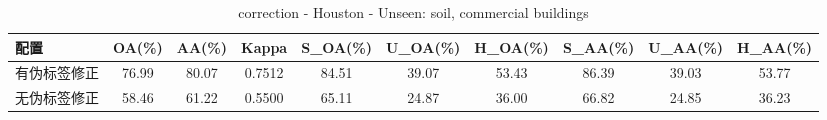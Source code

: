 \begin{table}[htbp]
\centering
\caption{correction - Houston - Unseen: soil, commercial buildings}
\begin{tabular}{lccccccccc}
\hline
配置 & OA(\%) & AA(\%) & Kappa & S\_OA(\%) & U\_OA(\%) & H\_OA(\%) & S\_AA(\%) & U\_AA(\%) & H\_AA(\%) \\
\hline
有伪标签修正 & 76.99 & 80.07 & 0.7512 & 84.51 & 39.07 & 53.43 & 86.39 & 39.03 & 53.77 \\
无伪标签修正 & 58.46 & 61.22 & 0.5500 & 65.11 & 24.87 & 36.00 & 66.82 & 24.85 & 36.23 \\
\hline
\end{tabular}
\end{table}